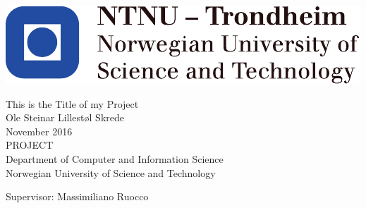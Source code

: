 
\thispagestyle{empty}
\includegraphics[scale=1.1]{fig/logos/NTNU}
\mbox{}\\[6pc]
\begin{center}
\Huge{This is the Title of my Project}\\[2pc]

\Large{Ole Steinar Lillestøl Skrede}\\[1pc]
\large{November 2016}\\[2pc]

PROJECT\\
Department of Computer and Information Science\\
Norwegian University of Science and Technology
\end{center}
\vfill

\noindent Supervisor: Massimiliano Ruocco


